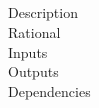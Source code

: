 \documentclass[12pt]{article}
\begin{document}
\subsection{}
\begin{description}
	\item[Description]
	\item[Rational]
	\item[Inputs]
	\item[Outputs]
	\item[Dependencies]
\end{description}
	


\begingroup
\renewcommand{\section}[2]{}
\begin{thebibliography}{10}

\bigskip


\end{thebibliography}
\endgroup
\end{document}
